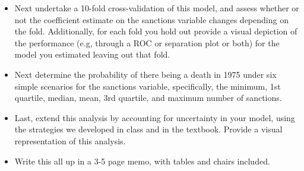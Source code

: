 \documentclass[10pt,letter]{article}
\begin{document}
\begin{itemize}
\begin{itemize}
		\item Next undertake a 10-fold cross-validation of this model, and assess whether or not the coefficient estimate on the sanctions variable changes depending on the fold. Additionally, for each fold you hold out provide a visual depiction of the performance (e.g, through a ROC or separation plot or both) for the model you estimated leaving out that fold.
		\item Next determine the probability of there being a death in 1975 under six simple scenarios for the sanctions variable, specifically, the minimum, 1st quartile, median, mean, 3rd quartile, and maximum number of sanctions. 
		\item Last, extend this analysis by accounting for uncertainty in your model, using the strategies we developed in class and in the textbook. Provide a visual representation of this analysis.
		\item Write this all up in a 3-5 page memo, with tables and chairs included.
	\end{itemize}
\end{itemize}

\newpage
\end{document}

